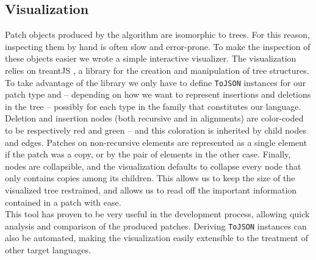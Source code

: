 \documentclass[11pt, titlepage]{article}
\newcommand{\toHaskell}[1]{\texttt{#1}\xspace}
\begin{document}
\subsection{Visualization}\label{viz}

Patch objects produced by the algorithm are isomorphic to trees. For this reason, inspecting them by hand is often slow and error-prone. To make the inspection of these objects easier we wrote a simple interactive visualizer. 
The visualization relies on treantJS \cite{treant}, a library for the creation and manipulation of tree structures. To take advantage of the library we only have to define \texttt{ToJSON} instances for our patch type and -- depending on how we want to represent insertions and deletions in the tree -- possibly for each type in the family that constitutes our language.
\\
Deletion and insertion nodes (both recursive and in alignments) are color-coded to be respectively red and green -- and this coloration is inherited by child nodes and edges. 
Patches on non-recursive elements are represented as a single element if the patch was a copy, or by the pair of elements in the other case. 
Finally, nodes are collapsible, and the visualization defaults to collapse every node that only contains copies among its children. This allows us to keep the size of the visualized tree restrained, and allows us to read off the important information contained in a patch with ease.
\\
This tool has proven to be very useful in the development process, allowing quick analysis and comparison of the produced patches. Deriving \toHaskell{ToJSON} instances can also be automated, making the visualization easily extensible to the treatment of other target languages.
\end{document}
